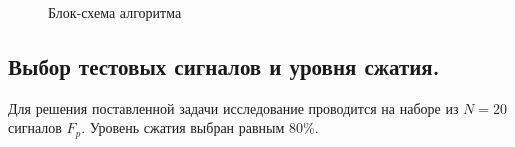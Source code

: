 \documentclass[11pt, oneside, a4paper]{article}
\begin{document}
\begin{figure}[h]
	\caption{Блок-схема алгоритма}
	\label{block-diagram}
\end{figure}

\subsection{Выбор тестовых сигналов и уровня сжатия.}
Для решения поставленной задачи исследование проводится на наборе из $N=20$ сигналов $F_p$. Уровень сжатия выбран равным $80\%$. 
\end{document}
